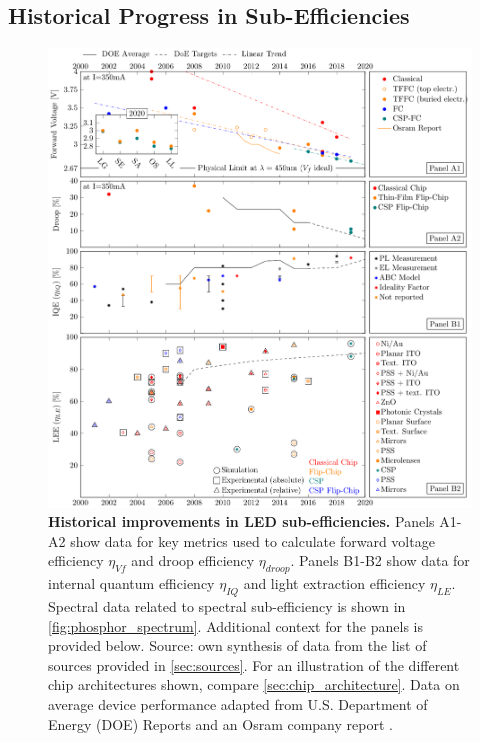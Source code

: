 \documentclass[parskip=full]{article}
\begin{document}
\clearpage
\subsection{Historical Progress in Sub-Efficiencies}
\label{sec:subeff_progress}

\begin{figure}[H]
\centering
\includegraphics[width=15.5cm]{./figures/subefficiencies_progress.pdf}
\caption{\textbf{Historical improvements in LED sub-efficiencies.} Panels A1-A2 show data for key metrics used to calculate forward voltage efficiency $\eta_{Vf}$ and droop efficiency $\eta_{droop}$. Panels B1-B2 show data for internal quantum efficiency $\eta_{IQ}$ and light extraction efficiency $\eta_{LE}$. Spectral data related to spectral sub-efficiency is shown in \cref{fig:phosphor_spectrum}. Additional context for the panels is provided below. Source: own synthesis of data from the list of sources provided in \cref{sec:sources}. For an illustration of the different chip architectures shown, compare \cref{sec:chip_architecture}. Data on average device performance adapted from U.S. Department of Energy (DOE) Reports \cite{doe_ssl_multiyear_2007}\cite{doe_ssl_multiyear_2008}\cite{doe_ssl_multiyear_2013}\cite{doe_ssl_rnd_2016}\cite{doe_ssl_rnd_2018} and an Osram company report \cite{beale_leds_2015}.}
\label{fgr:subeff}
\vspace{-20mm}
\end{figure}
\end{document}
